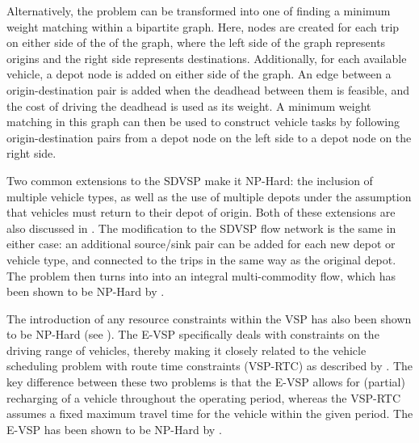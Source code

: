 \documentclass[]{article}
\begin{document}
Alternatively, the problem can be transformed into one of finding a minimum weight matching within a bipartite graph. Here, nodes are created for each trip on either side of the of the graph, where the left side of the graph represents origins and the right side represents destinations. Additionally, for each available vehicle, a depot node is added on either side of the graph. An edge between a origin-destination pair is added when the deadhead between them is feasible, and the cost of driving the deadhead is used as its weight. A minimum weight matching in this graph can then be used to construct vehicle tasks by following origin-destination pairs from a depot node on the left side to a depot node on the right side.

Two common extensions to the SDVSP make it NP-Hard: the inclusion of multiple vehicle types, as well as the use of multiple depots under the assumption that vehicles must return to their depot of origin. Both of these extensions are also discussed in \citet{Bunte2009}. The modification to the SDVSP flow network is the same in either case: an additional source/sink pair can be added for each new depot or vehicle type, and connected to the trips in the same way as the original depot. The problem then turns into into an integral multi-commodity flow, which has been shown to be NP-Hard by \citet{Even1975}.

The introduction of any resource constraints within the VSP has also been shown to be NP-Hard (see \citet{Bodin1983}). The E-VSP specifically deals with constraints on the driving range of vehicles, thereby making it closely related to the vehicle scheduling problem with route time constraints (VSP-RTC) as described by \citet{Haghani2002}. The key difference between these two problems is that the E-VSP allows for (partial) recharging of a vehicle throughout the operating period, whereas the VSP-RTC assumes a fixed maximum travel time for the vehicle within the given period. The E-VSP has been shown to be NP-Hard by \citet{Sassi2014}. \\
\end{document}
